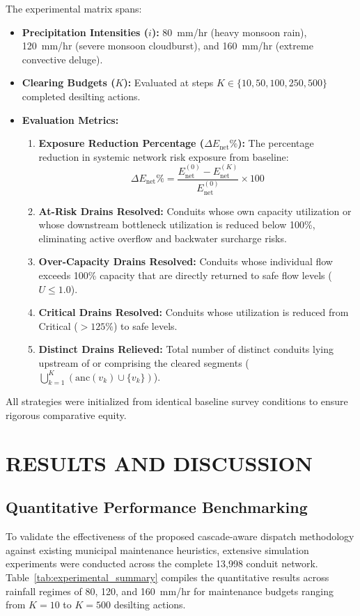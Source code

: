 \documentclass[12pt,a4paper]{report}
\begin{document}
The experimental matrix spans:
\begin{itemize}
    \item \textbf{Precipitation Intensities ($i$):} 80~mm/hr (heavy monsoon rain), 120~mm/hr (severe monsoon cloudburst), and 160~mm/hr (extreme convective deluge).
    \item \textbf{Clearing Budgets ($K$):} Evaluated at steps $K \in \{10, 50, 100, 250, 500\}$ completed desilting actions.
    \item \textbf{Evaluation Metrics:}
    \begin{enumerate}
        \item \textbf{Exposure Reduction Percentage ($\Delta E_{\text{net}}\%$):} The percentage reduction in systemic network risk exposure from baseline:
        \begin{equation}
        \Delta E_{\text{net}}\% = \frac{E_{\text{net}}^{(0)} - E_{\text{net}}^{(K)}}{E_{\text{net}}^{(0)}} \times 100
        \end{equation}
        \item \textbf{At-Risk Drains Resolved:} Conduits whose own capacity utilization or whose downstream bottleneck utilization is reduced below 100\%, eliminating active overflow and backwater surcharge risks.
        \item \textbf{Over-Capacity Drains Resolved:} Conduits whose individual flow exceeds 100\% capacity that are directly returned to safe flow levels ($U \le 1.0$).
        \item \textbf{Critical Drains Resolved:} Conduits whose utilization is reduced from Critical ($> 125\%$) to safe levels.
        \item \textbf{Distinct Drains Relieved:} Total number of distinct conduits lying upstream of or comprising the cleared segments ($\bigcup_{k=1}^K (\text{anc}(v_k) \cup \{v_k\})$).
    \end{enumerate}
\end{itemize}
All strategies were initialized from identical baseline survey conditions to ensure rigorous comparative equity.


\chapter{RESULTS AND DISCUSSION}

\section{Quantitative Performance Benchmarking}
To validate the effectiveness of the proposed cascade-aware dispatch methodology against existing municipal maintenance heuristics, extensive simulation experiments were conducted across the complete 13,998 conduit network. Table~\ref{tab:experimental_summary} compiles the quantitative results across rainfall regimes of 80, 120, and 160~mm/hr for maintenance budgets ranging from $K = 10$ to $K = 500$ desilting actions.
\end{document}
